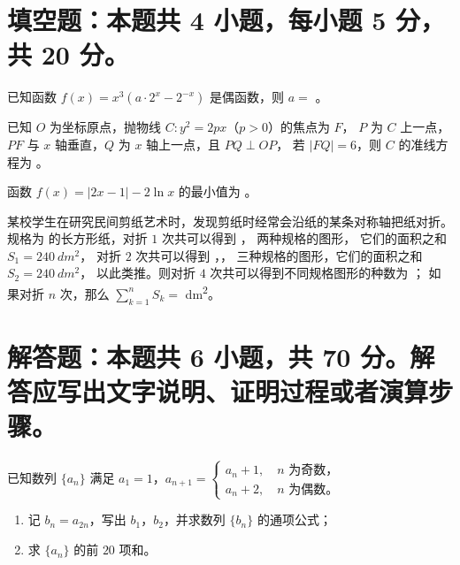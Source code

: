 \documentclass[zihao = -4]{exam-zh}
\begin{document}
\section{填空题：本题共 4 小题，每小题 5 分，共 20 分。}

\begin{question}
  已知函数 $f(x) = x^3 (a \cdot 2^x - 2^{-x})$ 是偶函数，则 $a = $ \fillin[$1$] 。
\end{question}

\begin{question}
  已知 $O$ 为坐标原点，抛物线 $C \colon y^2 = 2px$（$p > 0$）的焦点为 $F$，
  $P$ 为 $C$ 上一点，$PF$ 与 $x$ 轴垂直，$Q$ 为 $x$ 轴上一点，且 $PQ \perp OP$，
  若 $|FQ| = 6$，则 $C$ 的准线方程为 \fillin[$\dfrac{1}{3}$] 。
\end{question}

\begin{question}
  函数 $f(x) = |2x - 1| - 2 \ln x$ 的最小值为 \fillin 。
\end{question}

\begin{question}
  某校学生在研究民间剪纸艺术时，发现剪纸时经常会沿纸的某条对称轴把纸对折。
  规格为  的长方形纸，对折 $1$ 次共可以得到
  ，  两种规格的图形，
  它们的面积之和 $S_1 = \qty{240}{dm^2}$，
  对折 $2$ 次共可以得到 ，，
   三种规格的图形，它们的面积之和 $S_2 = \qty{240}{dm^2}$，
  以此类推。则对折 $4$ 次共可以得到不同规格图形的种数为 \fillin ；
  如果对折 $n$ 次，那么 $\sum_{k=1}^n S_k = $ \fillin \unit{dm^2}。
\end{question}



\section{解答题：本题共 6 小题，共 70 分。解答应写出文字说明、证明过程或者演算步骤。}

\begin{problem}[points = 10]
  已知数列 $\{a_n\}$ 满足 $a_1 = 1$，$a_{n+1} =
    \begin{cases}
      a_n + 1, \quad \text{$n$ 为奇数，} \\
      a_n + 2, \quad \text{$n$ 为偶数。}
    \end{cases}$
  \begin{enumerate}
    \item 记 $b_n = a_{2n}$，写出 $b_1$，$b_2$，并求数列 $\{b_n\}$ 的通项公式；
    \item 求 $\{a_n\}$ 的前 $20$ 项和。
  \end{enumerate}
\end{problem}
\end{document}
